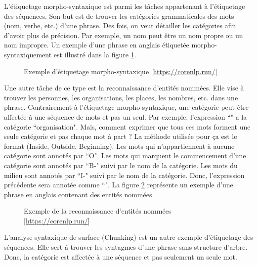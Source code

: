 \documentclass{KodeBook}
\begin{document}
L'étiquetage morpho-syntaxique est parmi les tâches appartenant à l'étiquetage des séquences. 
Son but est de trouver les catégories grammaticales des mots (nom, verbe, etc.) d'une phrase. 
Des fois, on veut détailler les catégories afin d'avoir plus de précision. 
Par exemple, un nom peut être un nom propre ou un nom impropre.
Un exemple d'une phrase en anglais étiquetée morpho-syntaxiquement est illustré dans la figure \ref{fig:ems-exp}.
\begin{figure}[ht]
	\centering
	\caption[Exemple d'étiquetage morpho-syntaxique]{Exemple d'étiquetage morpho-syntaxique [\url{https://corenlp.run/}]\label{fig:ems-exp}}
\end{figure}

Une autre tâche de ce type est la reconnaissance d'entités nommées.
Elle vise à trouver les personnes, les organisations, les places, les nombres, etc. dans une phrase. 
Contrairement à l'étiquetage morpho-syntaxique, une catégorie peut être affectée à une séquence de mots et pas un seul. 
Par exemple, l'expression ``" a la catégorie ``organisation".
Mais, comment exprimer que tous ces mots forment une seule catégorie et pas chaque mot à part ?
La méthode utilisée pour ça est le format  (Inside, Outside, Beginning). 
Les mots qui n'appartiennent à aucune catégorie sont annotés par ``O". 
Les mots qui marquent le commencement d'une catégorie sont annotés par ``B-" suivi par le nom de la catégorie. 
Les mots du milieu sont annotés par ``I-" suivi par le nom de la catégorie. 
Donc, l'expression précédente sera annotée comme ``".
La figure \ref{fig:ner-exp} représente un exemple d'une phrase en anglais contenant des entités nommées.
\begin{figure}[ht]
	\centering
	\caption[Exemple de la reconnaissance d'entités nommées]{Exemple de la reconnaissance d'entités nommées [\url{https://corenlp.run/}]\label{fig:ner-exp}}
\end{figure}

L'analyse syntaxique de surface (Chunking) est un autre exemple d'étiquetage des séquences.
Elle sert à trouver les syntagmes d'une phrase sans structure d'arbre. 
Donc, la catégorie est affectée à une séquence et pas seulement un seule mot.


\end{document}
